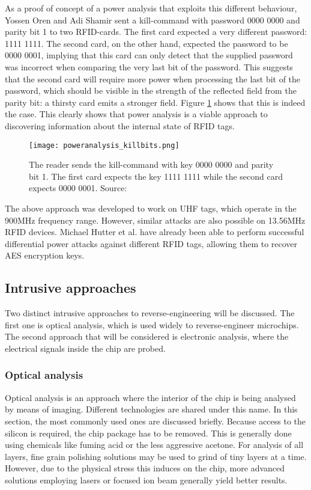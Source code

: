\documentclass{llncs}
\begin{document}
As a proof of concept of a power analysis that exploits this different behaviour, Yossen Oren and Adi Shamir\cite{doc:yossen-shamir_poweranalysis} sent a kill-command with password 0000 0000 and parity bit 1 to two RFID-cards. The first card expected a very different password: 1111 1111. The second card, on the other hand, expected the password to be 0000 0001, implying that this card can only detect that the supplied password was incorrect when comparing the very last bit of the password. This suggests that the second card will require more power when processing the last bit of the password, which should be visible in the strength of the reflected field from the parity bit: a thirsty card emits a stronger field. Figure \ref{fig:thirstyPOC} shows that this is indeed the case. This clearly shows that power analysis is a viable approach to discovering information about the internal state of RFID tags. 

\begin{figure}[ht!]
\centering
\texttt{[image: poweranalysis\_killbits.png]}
\caption{The reader sends the kill-command with key 0000 0000 and parity bit 1. The first card expects the key 1111 1111 while the second card expects 0000 0001. Source: \cite{doc:yossen-shamir_poweranalysis}}
\label{fig:thirstyPOC}
\end{figure}

The above approach was developed to work on UHF tags, which operate in the 900MHz frequency range. However, similar attacks are also possible on 13.56MHz RFID devices. Michael Hutter et al. have already been able to perform successful differential power attacks against different RFID tags, allowing them to recover AES encryption keys\cite{doc:hutter_powerEManalysis}. 

\subsection{Intrusive approaches}
Two distinct intrusive approaches to reverse-engineering will be discussed. The first one is optical analysis, which is used widely to reverse-engineer microchips. The second approach that will be considered is electronic analysis, where the electrical signals inside the chip are probed. 

\subsubsection{Optical analysis}
Optical analysis is an approach where the interior of the chip is being analysed by means of imaging. Different technologies are shared under this name. In this section, the most commonly used ones are discussed briefly. Because access to the silicon is required, the chip package has to be removed. This is generally done using chemicals like fuming acid or the less aggressive acetone. For analysis of all layers, fine grain polishing solutions may be used to grind of tiny layers at a time. However, due to the physical stress this induces on the chip, more advanced solutions employing lasers or focused ion beam generally yield better results. 
\end{document}
